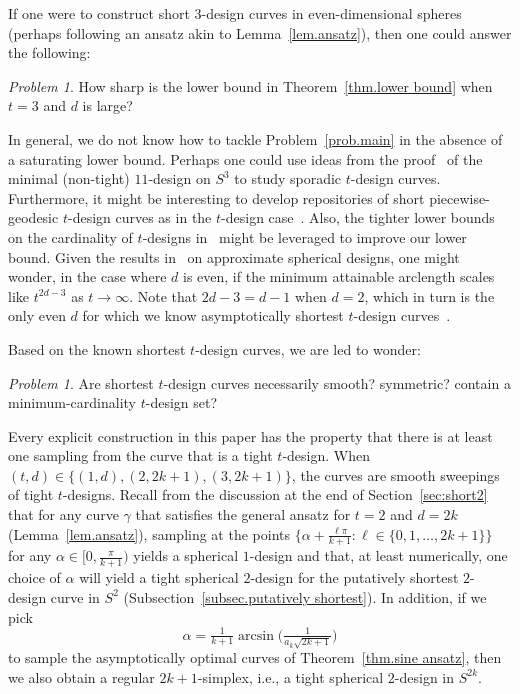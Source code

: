 \documentclass[12pt]{article}
\theoremstyle{plain}
\theoremstyle{definition}
\theoremstyle{remark}
\newtheorem{prob}[thm]{Problem}
\newcommand{\rar}{\rightarrow}
\begin{document}
If one were to construct short $3$-design curves in even-dimensional spheres (perhaps following an ansatz akin to Lemma~\ref{lem.ansatz}), then one could answer the following:

\begin{prob}
How sharp is the lower bound in Theorem~\ref{thm.lower bound} when $t=3$ and $d$ is large?
\end{prob}


In general, we do not know how to tackle Problem~\ref{prob.main} in the absence of a saturating lower bound.
Perhaps one could use ideas from the proof~\cite{Andreev:00,BoyvalenkovD:01} of the minimal (non-tight) $11$-design on $S^3$ to study sporadic $t$-design curves.
Furthermore, it might be interesting to develop repositories of short piecewise-geodesic $t$-design curves as in the $t$-design case~\cite{SloaneHC:03,HardinS:92,Graef:online,Womersley:online}.
Also, the tighter lower bounds on the cardinality of $t$-designs in~\cite{Yudin:97} might be leveraged to improve our lower bound.
Given the results in~\cite{Lindblad:25} on approximate spherical designs, one might wonder, in the case where $d$ is even, if the minimum attainable arclength scales like $t^{2d-3}$  as $t \rar \infty$.
Note that $2d-3=d-1$ when $d=2$, which in turn is the only even $d$ for which we know asymptotically shortest $t$-design curves~\cite{EhlerG:23}. 

Based on the known shortest $t$-design curves, we are led to wonder:

\begin{prob}
Are shortest $t$-design curves necessarily smooth?
symmetric? contain a minimum-cardinality $t$-design set?
\end{prob}

Every explicit construction in this paper has the property that there is at least one sampling from the curve that is a tight $t$-design. 
When $(t,d) \in \{(1,d),(2,2k+1),(3,2k+1)\}$, the curves are smooth sweepings of tight $t$-designs.
Recall from the discussion at the end of Section~\ref{sec:short2} that for any curve $\gamma$ that satisfies the general ansatz for $t=2$ and $d=2k$ (Lemma~\ref{lem.ansatz}), sampling at the points $\{\alpha + \frac{\ell \pi}{k+1} : \ell \in\{0, 1, \ldots, 2k+1\}\}$ for any $\alpha \in [0,\frac{\pi}{k+1})$ yields a spherical $1$-design and that, at least numerically, one choice of $\alpha$ will yield a tight spherical $2$-design for the putatively shortest $2$-design curve in $S^2$ (Subsection~\ref{subsec.putatively shortest}).
In addition, if we pick 
\[
\alpha = \tfrac{1}{k+1} \arcsin\big( \tfrac{1}{a_k \sqrt{2k+1}}\big)
\]
to sample the asymptotically optimal curves of Theorem~\ref{thm.sine ansatz}, then we also obtain a regular $2k+1$-simplex, i.e., a tight spherical $2$-design in $S^{2k}$.
\end{document}
